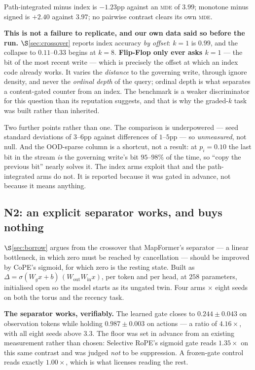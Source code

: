 \documentclass[11pt]{article}
\begin{document}
\noindent Path-integrated minus index is $-1.23$pp against an \textsc{mde} of
$3.99$; monotone minus signed is $+2.40$ against $3.97$; no pairwise contrast clears
its own \textsc{mde}.

\textbf{This is not a failure to replicate, and our own data said so before the run.}
$\S$\ref{sec:crossover} reports index accuracy \emph{by offset}: $k=1$ is
$0.99$, and the collapse to $0.11$--$0.33$ begins at $k=8$. \textbf{Flip-Flop only
ever asks $k=1$} --- the bit of the most recent write --- which is precisely the
offset at which an index code already works. It varies the \emph{distance} to the
governing write, through ignore density, and never the \emph{ordinal depth} of the
query; ordinal depth is what separates a content-gated counter from an index. The
benchmark is a weaker discriminator for this question than its reputation suggests,
and that is why the graded-$k$ task was built rather than inherited.

Two further points rather than one. The comparison is underpowered --- seed
standard deviations of $3$--$6$pp against differences of $1$--$5$pp --- so
\emph{unmeasured}, not null. And the OOD-sparse column is a shortcut, not a result:
at $p_i = 0.10$ the last bit in the stream \emph{is} the governing write's bit
$95$--$98\%$ of the time, so ``copy the previous bit'' nearly solves it. The index
arms exploit that and the path-integrated arms do not. It is reported because it was
gated in advance, not because it means anything.

\subsection{N2: an explicit separator works, and buys nothing}
\label{sec:gated}

$\S$\ref{sec:borrow} argues from the crossover that MapFormer's separator --- a
linear bottleneck, in which zero must be reached by cancellation --- should be
improved by CoPE's sigmoid, for which zero is the resting state. Built as
$\Delta = \sigma(W_g x + b)\,(W_{\mathrm{out}}W_{\mathrm{in}}x)$, per token and per
head, at $258$ parameters, initialised open so the model starts as its ungated twin.
Four arms $\times$ eight seeds on both the torus and the recency task.

\textbf{The separator works, verifiably.} The learned gate closes to
$0.244 \pm 0.043$ on observation tokens while holding $0.987 \pm 0.003$ on actions
--- a ratio of $\mathbf{4.16\times}$, with all eight seeds above $3.3$. The floor was
set in advance from an existing measurement rather than chosen: Selective RoPE's
sigmoid gate reads $1.35\times$ on this same contrast and was judged \emph{not} to be
suppression. A frozen-gate control reads exactly $1.00\times$, which is what licenses
reading the rest.
\end{document}
